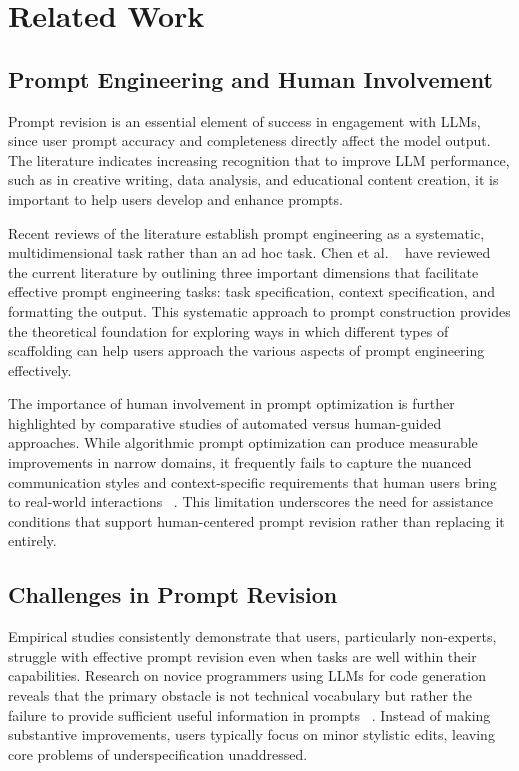 \section{\textbf{Related Work}}

\subsection{\textbf{Prompt Engineering and Human Involvement}}
Prompt revision is an essential element of success in engagement with LLMs, since user prompt accuracy and completeness directly affect the model output. The literature indicates increasing recognition that to improve LLM performance, such as in creative writing, data analysis, and educational content creation, it is important to help users develop and enhance prompts.

Recent reviews of the literature establish prompt engineering as a systematic, multidimensional task rather than an ad hoc task. Chen et al. ~\cite{Chen2023Unleashing} have reviewed the current literature by outlining three important dimensions that facilitate effective prompt engineering tasks: task specification, context specification, and formatting the output. This systematic approach to prompt construction provides the theoretical foundation for exploring ways in which different types of scaffolding can help users approach the various aspects of prompt engineering effectively.

The importance of human involvement in prompt optimization is further highlighted by comparative studies of automated versus human-guided approaches. While algorithmic prompt optimization can produce measurable improvements in narrow domains, it frequently fails to capture the nuanced communication styles and context-specific requirements that human users bring to real-world interactions ~\cite{Ramnath2025Systematic}. This limitation underscores the need for assistance conditions that support human-centered prompt revision rather than replacing it entirely.

\subsection{\textbf{Challenges in Prompt Revision}}
Empirical studies consistently demonstrate that users, particularly non-experts, struggle with effective prompt revision even when tasks are well within their capabilities. Research on novice programmers using LLMs for code generation reveals that the primary obstacle is not technical vocabulary but rather the failure to provide sufficient useful information in prompts ~\cite{Lucchetti2024Beginning}. Instead of making substantive improvements, users typically focus on minor stylistic edits, leaving core problems of underspecification unaddressed.

